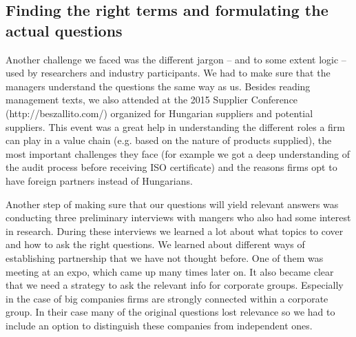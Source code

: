 \documentclass[final, dvipsnames, authoryear,12pt]{elsarticle}
\begin{document}
\subsection{Finding the right terms and formulating the actual questions}
\label{sec:terms}

Another challenge we faced was the different jargon -- and to some extent logic -- used by researchers and industry participants. We had to make sure that the managers understand the questions the same way as us. Besides reading management texts, we also attended at the 2015 Supplier Conference (http://beszallito.com/) organized for Hungarian suppliers and potential suppliers. This event was a great help in understanding the different roles a firm can play in a value chain (e.g. based on the nature of products supplied), the most important challenges they face (for example we got a deep understanding of the audit process before receiving ISO certificate) and the reasons firms opt to have foreign partners instead of Hungarians.

Another step of making sure that our questions will yield relevant answers was conducting three preliminary interviews with mangers who also had some interest in research. During these interviews we learned a lot about what topics to cover and how to ask the right questions. We learned about different ways of establishing partnership that we have not thought before. One of them was meeting at an expo, which came up many times later on. It also became clear that we need a strategy to ask the relevant info for corporate groups. Especially in the case of big companies firms are strongly connected within a corporate group. In their case many of the original questions lost relevance so we had to include an option to distinguish these companies from independent ones.


\end{document}
